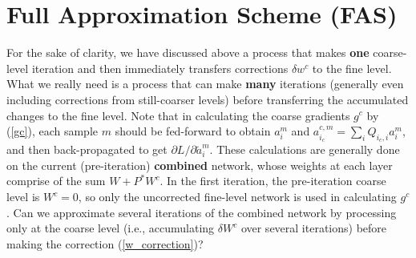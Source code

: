 \documentclass{article} %
\begin{document}
\section{Full Approximation Scheme (FAS)}
\label{sec:fas}
For the sake of clarity, we have discussed above a process that makes \textbf{one} coarse-level iteration and then immediately transfers corrections $\delta w^c$ to the fine level. What we really need is a process that can make \textbf{many} iterations (generally even including corrections from still-coarser levels) before transferring the accumulated changes to the fine level. Note that in calculating the coarse gradients $g^c$ by (\ref{gc}), each sample $m$ should be fed-forward to obtain $a^m_i$ and $a^{c,m}_{i_c} = \sum_i Q_{i_c,i} a^m_i$, and then back-propagated to get $\partial L/\partial \tilde{a}^m_i$. These calculations are generally done on the current (pre-iteration) \textbf{combined} network, whose weights at each layer comprise of the sum $W + P^* W^c$. In the first iteration, the pre-iteration coarse level is $W^c = 0$, so only the uncorrected fine-level network is used in calculating $g^c$. Can we approximate several iterations of the combined network by processing only at the coarse level (i.e., accumulating $\delta W^c$ over several iterations) before making the correction (\ref{w_correction})?
\end{document}
